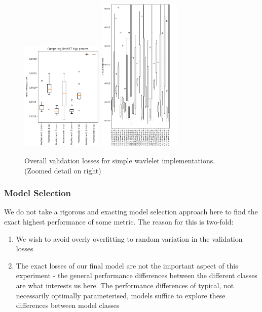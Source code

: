 \documentclass[9pt,conference]{IEEEtran}
\begin{document}
\begin{figure}
    \centering
    \includegraphics[width=0.35\textwidth]{resnetParams.png}
    \includegraphics[width=0.35\textwidth]{waveletParamLossesDetail.png}
    \caption{Overall validation losses for simple wavlelet implementations. (Zoomed detail on right)}
\end{figure}

\clearpage


\subsubsection{Model Selection}

We do not take a rigorous and exacting model selection approach here to find the exact highest performance of some metric. The reason for this is two-fold:

\begin{enumerate}
    \item We wish to avoid overly overfitting to random variation in the validation losses
    \item The exact losses of our final model are not the important aspect of this experiment - the general performance differences between the different classes are what interests us here. The performance differences of typical, not necessarily optimally parameterised, models suffice to explore these differences between model classes
\end{enumerate}
\end{document}

